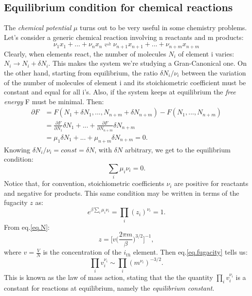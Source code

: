 \subsection{Equilibrium condition for chemical reactions}
The \textit{chemical potential} $\mu$ turns out to be very useful in some chemistry problems. Let's consider a generic chemical reaction involving n reactants and m products:
\begin{equation}
    \nu_1 x_1 + ... + \nu_n x_n \rightleftharpoons \nu_{n+1} x_{n+1} + ... + \nu_{n+m} x_{n+m}
\end{equation}
Clearly, when elements react, the number of molecules $N_i$ of element i varies: $N_i \rightarrow N_i+\delta N_i$. This makes the system we're studying a Gran-Canonical one. On the other hand, starting from equilibrium, the ratio $\delta N_i/\nu_i$ between the variation of the number of molecules of element i and its stoichiometric coefficient must be constant and equal for all i's. Also, if the system keeps at equilibrium the \textit{free energy} F must be minimal. Then:
\begin{equation}
    \begin{split}
    \partial F &= F(N_1+\delta N_1,...,N_{n+m}+\delta N_{n+m})-F(N_1,...,N_{n+m})\\
    &=\frac{\partial F}{\partial N_1}\delta N_1+...+\frac{\partial F}{\partial N_{n+m}}\delta N_{n+m}\\
    &=\mu_1 \delta N_1+...+\mu_{n+m} \delta N_{n+m}=0.
    \end{split}
\end{equation}
Knowing $\delta N_i/\nu_i= const=\delta N$, with $\delta N$ arbitrary, we get to the equilibrium condition:
\begin{equation}
    \sum_i \mu_i \nu_i=0.
\end{equation}
Notice that, for convention, stoichiometric coefficients $\nu_i$ are positive for reactants and negative for products. This same condition may be written in terms of the fugacity $z$ as:
\begin{equation}
    e^{\beta\sum_i \mu_i \nu_i}=\prod_i (z_i)^{\nu_i}=1.\label{eq.fugacity}
\end{equation}
From eq.\ref{eq.N}:
\begin{equation}
    z=\bigl[ v \bigl( \frac{2\pi m}{\beta}\bigr)^{3/2}\bigr]^{-1}, 
\end{equation}
where $v=\frac{V}{N}$ is the concentration of the $i_{th}$ element. Then eq.\ref{eq.fugacity} tells us:
\begin{equation}
    \prod_i v_i^{\nu_i}\sim\prod_i (m^{\nu_i})^{-3/2}.  
\end{equation}
This is known as the law of mass action, stating that the the quantity $\prod_i v_i^{\nu_i}$ is a constant for reactions at equilibrium, namely the \textit{equilibrium constant}.  